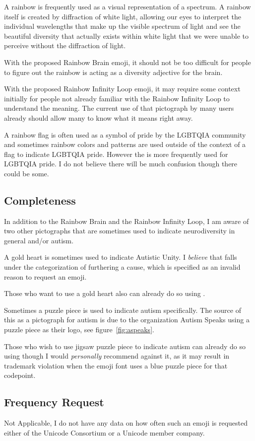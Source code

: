 A rainbow is frequently used as a visual representation of a spectrum. A rainbow itself is
created by diffraction of white light, allowing our eyes to interpret the individual
wavelengths that make up the visible spectrum of light and see the beautiful diversity that
actually exists within white light that we were unable to perceive without the diffraction of
light.

With the proposed Rainbow Brain emoji, it should not be too difficult for people to figure out
the rainbow is acting as a diversity adjective for the brain.

With the proposed Rainbow Infinity Loop emoji, it may require some context initially for people
not already familiar with the Rainbow Infinity Loop to understand the meaning. The current use
of that pictograph by many users already should allow many to know what it means right away.

A rainbow flag is often used as a symbol of pride by the LGBTQIA community and sometimes rainbow colors
and patterns are used outside of the context of a flag to indicate LGBTQIA pride. However the
\prideflag{} is more frequently used for
LGBTQIA pride. I do not believe there will be much confusion though there could be some.

\subsection{Completeness}

In addition to the Rainbow Brain and the Rainbow Infinity Loop, I am aware of two other pictographs
that are sometimes used to indicate neurodiversity in general and/or autism.

A gold heart is sometimes used to indicate Autistic Unity. I \emph{believe} that falls under the
categorization of furthering a cause, which is specified as an invalid reason to request an emoji.

Those who want to use a gold heart also can already do so using \goldheart{}.

Sometimes a puzzle piece is used to indicate autism specifically. The source of this as a pictograph
for autism is due to the organization Autism Speaks using a puzzle piece as their logo, see
figure~\ref{fig:aspeaks}.

Those who wish to use jigsaw puzzle piece to indicate autism can already do so using \jigsawemoji{}
though I would \emph{personally} recommend against it, as it may result in trademark violation when
the emoji font uses a blue puzzle piece for that codepoint.

\subsection{Frequency Request}

Not Applicable, I do not have any data on how often such an emoji is requested either of the
Unicode Consortium or a Unicode member company.

